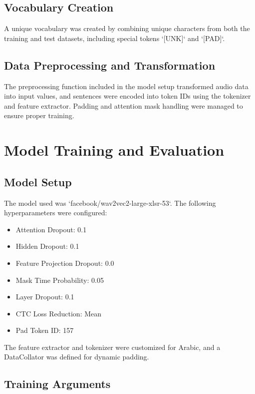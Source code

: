 \documentclass[a4paper,12pt]{article}
\begin{document}
\subsection*{Vocabulary Creation}

A unique vocabulary was created by combining unique characters from both the training and test datasets, including special tokens `[UNK]` and `[PAD]`.


\subsection*{Data Preprocessing and Transformation}

The preprocessing function included in the model setup transformed audio data into input values, and sentences were encoded into token IDs using the tokenizer and feature extractor. Padding and attention mask handling were managed to ensure proper training.

\section*{Model Training and Evaluation}

\subsection*{Model Setup}

The model used was `facebook/wav2vec2-large-xlsr-53`. The following hyperparameters were configured:

\begin{itemize}
    \item Attention Dropout: 0.1
    \item Hidden Dropout: 0.1
    \item Feature Projection Dropout: 0.0
    \item Mask Time Probability: 0.05
    \item Layer Dropout: 0.1
    \item CTC Loss Reduction: Mean
    \item Pad Token ID: 157
\end{itemize}

The feature extractor and tokenizer were customized for Arabic, and a DataCollator was defined for dynamic padding.

\subsection*{Training Arguments}
\end{document}
